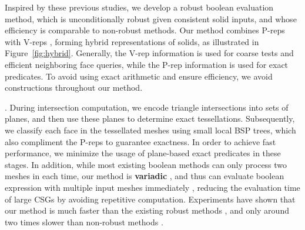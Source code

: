 Inspired by these previous studies, we develop a robust boolean evaluation method, which is unconditionally robust given consistent solid inputs, and whose efficiency is comparable to non-robust methods. Our method combines P-reps with V-reps , forming hybrid representations of solids, as illustrated in Figure~\ref{fig:hybrid}. Generally, the V-rep information is used for coarse tests and efficient neighboring face queries, while the P-rep information is used for exact predicates. To avoid using exact arithmetic and ensure efficiency, we avoid constructions throughout our method.
%


.  During intersection computation, we encode triangle intersections into sets of planes, and then use these planes to determine exact tessellations.  Subsequently, we classify each face in the tessellated meshes using small local BSP trees, which also compliment the P-reps to guarantee exactness. In order to achieve fast performance, we minimize the usage of plane-based exact predicates in these stages. In addition, while most existing boolean methods can only process two meshes in each time, our method is \textbf{variadic} \cite{zhou2016mesh} , and thus can evaluate boolean expression with multiple input meshes immediately , reducing the evaluation time of large CSGs by avoiding repetitive computation. Experiments have shown that our method is much faster than the existing robust methods , and only around two times slower than non-robust methods .

